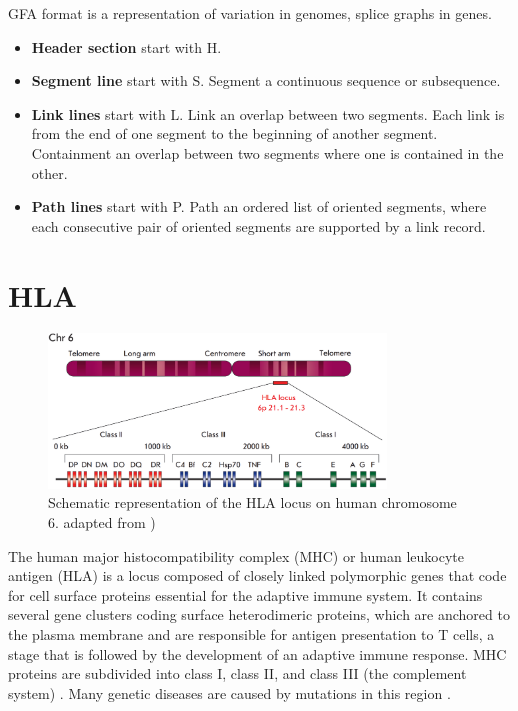

GFA format is a representation of variation in genomes, splice graphs in genes.





\begin{itemize}

\item\textbf{Header section} start with H.
\item\textbf{Segment line} start with S.
Segment a continuous sequence or subsequence.
\item\textbf{Link lines} start with L.
Link an overlap between two segments. Each link is from the end of one segment to the beginning of another segment. Containment an overlap between two segments where one is contained in the other.
\item\textbf{Path lines} start with P. 
Path an ordered list of oriented segments, where each consecutive pair of oriented segments are supported by a link record.



\end{itemize}

\section{HLA}

\begin{figure}[H]
\centering
\includegraphics[width=0.80\textwidth]{fig/HLA_loci.png}
\decoRule
\caption{Schematic representation of the HLA locus on human chromosome 6. adapted from \cite{zakharova2019contribution})}
\label{fig:HLA.png}
\end{figure}




The human major histocompatibility complex (MHC) or human leukocyte antigen (HLA) is a locus composed of closely linked polymorphic genes that code for cell surface proteins essential for the adaptive immune system. It contains several gene clusters coding surface heterodimeric proteins, which are anchored to the plasma membrane and are responsible for antigen presentation to T cells, a stage that is followed by the development of an adaptive immune response. MHC proteins are subdivided into class I, class II, and class III (the complement system) \cite{campbell1993map}. Many genetic diseases are caused by mutations in this region \cite{tiwari2012hla}.  


